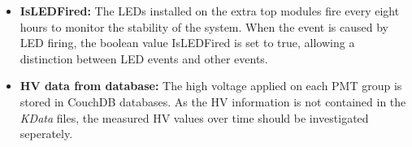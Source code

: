 \begin{itemize}
  \item \textbf{IsLEDFired: }
  The LEDs installed on the extra top modules fire every eight hours to monitor the stability of the system. When the event is caused by LED firing, the boolean value IsLEDFired is set to true, allowing a distinction between LED events and other events.

  \item \textbf{HV data from database: }
  The high voltage applied on each PMT group is stored in CouchDB databases. As the HV information is not contained in the \textit{KData} files, the measured HV values over time should be investigated seperately.
\end{itemize}



